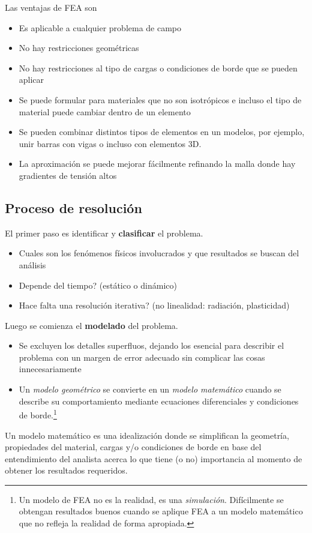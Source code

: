 \documentclass[11pt, a4paper,titlepage]{article}
\begin{document}
Las ventajas de FEA son
\vspace{-.3cm}
\begin{itemize}
	\item Es aplicable a cualquier problema de campo
	\item No hay restricciones geométricas
	\item No hay restricciones al tipo de cargas o condiciones de borde que se pueden aplicar
	\item Se puede formular para materiales que no son isotrópicos e incluso el tipo de material puede cambiar dentro de un elemento
	\item Se pueden combinar distintos tipos de elementos en un modelos, por ejemplo, unir barras con vigas o incluso con elementos 3D.
	\item La aproximación se puede mejorar fácilmente refinando la malla donde hay gradientes de tensión altos
\end{itemize}
\vspace{-.7cm}
\subsection*{Proceso de resolución}
El primer paso es identificar y \textbf{clasificar} el problema.
\begin{itemize}
	\item Cuales son los fenómenos físicos involucrados y que resultados se buscan del análisis
	\item Depende del tiempo? (estático o dinámico)
	\item Hace falta una resolución iterativa? (no linealidad: radiación, plasticidad)
\end{itemize} 

Luego se comienza el \textbf{modelado} del problema.
\begin{itemize}
	\item Se excluyen los detalles superfluos, dejando los esencial para describir el problema con un margen de error adecuado sin complicar las cosas innecesariamente 
	\item Un \textit{modelo geométrico} se convierte en un \textit{modelo matemático} cuando se describe su comportamiento mediante ecuaciones diferenciales y condiciones de borde.\footnote{Un modelo de FEA no es la realidad, es una \textit{simulación}. Difícilmente se obtengan resultados buenos cuando se aplique FEA a un modelo matemático que no refleja la realidad de forma apropiada.}
	\end{itemize}
Un modelo matemático es una idealización donde se simplifican la geometría, propiedades del material, cargas y/o condiciones de borde en base del entendimiento del analista acerca lo que tiene (o no) importancia al momento de obtener los resultados requeridos.
\end{document}
